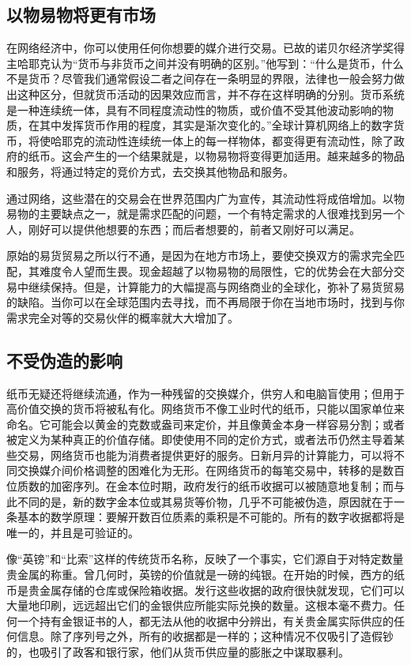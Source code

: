 \subsection{以物易物将更有市场}
在网络经济中，你可以使用任何你想要的媒介进行交易。已故的诺贝尔经济学奖得主哈耶克认为“货币与非货币之间并没有明确的区别。”他写到：“什么是货币，什么不是货币？尽管我们通常假设二者之间存在一条明显的界限，法律也一般会努力做出这种区分，但就货币活动的因果效应而言，并不存在这样明确的分别。货币系统是一种连续统一体，具有不同程度流动性的物质，或价值不受其他波动影响的物质，在其中发挥货币作用的程度，其实是渐次变化的。”全球计算机网络上的数字货币，将使哈耶克的流动性连续统一体上的每一样物体，都变得更有流动性，除了政府的纸币。这会产生的一个结果就是，以物易物将变得更加适用。越来越多的物品和服务，将通过特定的竞价方式，去交换其他物品和服务。

通过网络，这些潜在的交易会在世界范围内广为宣传，其流动性将成倍增加。以物易物的主要缺点之一，就是需求匹配的问题，一个有特定需求的人很难找到另一个人，刚好可以提供他想要的东西；而后者想要的，前者又刚好可以满足。

原始的易货贸易之所以行不通，是因为在地方市场上，要使交换双方的需求完全匹配，其难度令人望而生畏。现金超越了以物易物的局限性，它的优势会在大部分交易中继续保持。但是，计算能力的大幅提高与网络商业的全球化，弥补了易货贸易的缺陷。当你可以在全球范围内去寻找，而不再局限于你在当地市场时，找到与你需求完全对等的交易伙伴的概率就大大增加了。

\subsection{不受伪造的影响}
纸币无疑还将继续流通，作为一种残留的交换媒介，供穷人和电脑盲使用；但用于高价值交换的货币将被私有化。网络货币不像工业时代的纸币，只能以国家单位来命名。它可能会以黄金的克数或盎司来定价，并且像黄金本身一样容易分割；或者被定义为某种真正的价值存储。即使使用不同的定价方式，或者法币仍然主导着某些交易，网络货币也能为消费者提供更好的服务。日新月异的计算能力，可以将不同交换媒介间价格调整的困难化为无形。在网络货币的每笔交易中，转移的是数百位质数的加密序列。在金本位时期，政府发行的纸币收据可以被随意地复制；而与此不同的是，新的数字金本位或其易货等价物，几乎不可能被伪造，原因就在于一条基本的数学原理：要解开数百位质素的乘积是不可能的。所有的数字收据都将是唯一的，并且是可验证的。

像“英镑”和“比索”这样的传统货币名称，反映了一个事实，它们源自于对特定数量贵金属的称重。曾几何时，英镑的价值就是一磅的纯银。在开始的时候，西方的纸币是贵金属存储的仓库或保险箱收据。发行这些收据的政府很快就发现，它们可以大量地印刷，远远超出它们的金银供应所能实际兑换的数量。这根本毫不费力。任何一个持有金银证书的人，都无法从他的收据中分辨出，有关贵金属实际供应的任何信息。除了序列号之外，所有的收据都是一样的；这种情况不仅吸引了造假钞的，也吸引了政客和银行家，他们从货币供应量的膨胀之中谋取暴利。

